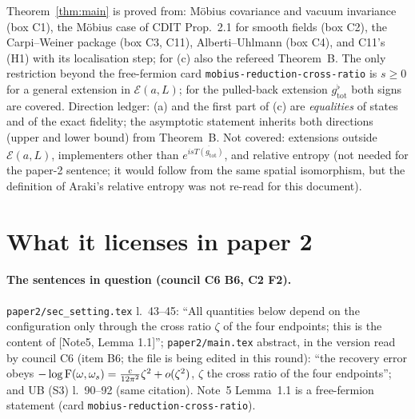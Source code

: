 \documentclass[11pt]{article}
\newcommand{\gtot}{g_{\mathrm{tot}}}
\begin{document}
\begin{verdictok}
Theorem~\ref{thm:main} is proved from: Möbius covariance and vacuum invariance (box C1), the Möbius case of CDIT
Prop.~2.1 for smooth fields (box C2), the Carpi--Weiner package (box C3, C11), Alberti--Uhlmann (box C4), and C11's
(H1) with its localisation step; for (c) also the refereed Theorem~B.  The only restriction beyond the free-fermion card
\texttt{mobius-reduction-cross-ratio} is $s\ge0$ for a general extension in $\mathcal E(a,L)$; for the pulled-back
extension $\gtot^\flat$ both signs are covered.  Direction ledger: (a) and the first part of (c) are \emph{equalities}
of states and of the exact fidelity; the asymptotic statement inherits both directions (upper and lower bound) from
Theorem~B.  Not covered: extensions outside $\mathcal E(a,L)$, implementers other than $e^{is\overline{T(\gtot)}}$, and
relative entropy (not needed for the paper-2 sentence; it would follow from the same spatial isomorphism, but the
definition of Araki's relative entropy was not re-read for this document).
\end{verdictok}

\section{What it licenses in paper 2}\label{sec:paper2}
\paragraph{The sentences in question (council C6 B6, C2 F2).}  \texttt{paper2/sec\_setting.tex} l.~43--45: ``All
quantities below depend on the configuration only through the cross ratio $\zeta$ of the four endpoints; this is the
content of [Note5, Lemma 1.1]''; \texttt{paper2/main.tex} abstract, in the version read by council C6 (item B6; the file is being edited in this round): ``the recovery error obeys
$-\log\operatorname{F}(\omega,\omega_s)=\frac c{12\pi^2}\zeta^2+o(\zeta^2)$, $\zeta$ the cross ratio of the four endpoints''; and UB (S3)
l.~90--92 (same citation).  Note~5 Lemma~1.1 is a free-fermion statement (card \texttt{mobius-reduction-cross-ratio}).
\end{document}
